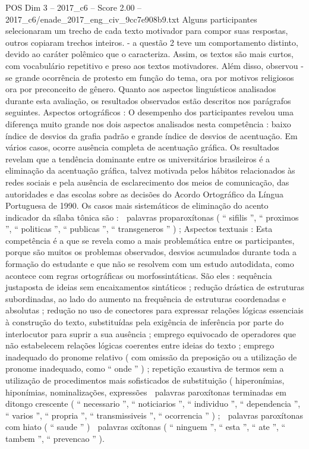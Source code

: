 \begin{textsample}{POS Dim 3 – 2017\_c6 – Score 2.00 – 2017\_c6/enade\_2017\_eng\_civ\_9cc7e908b9.txt}
Alguns participantes selecionaram um trecho de cada texto motivador para compor suas respostas, outros copiaram trechos inteiros. - a questão 2 teve um comportamento distinto, devido ao caráter polêmico que o caracteriza.
Assim, os textos são mais curtos, com vocabulário repetitivo e preso aos textos motivadores.
Além disso, observou -se grande ocorrência de protesto em função do tema, ora por motivos religiosos ora por preconceito de gênero.
Quanto aos aspectos linguísticos analisados durante esta avaliação, os resultados observados estão descritos nos parágrafos seguintes.
Aspectos ortográficos : O desempenho dos participantes revelou uma diferença muito grande nos dois aspectos analisados nesta competência : baixo índice de desvios da grafia padrão e grande índice de desvios de acentuação.
Em vários casos, ocorre ausência completa de acentuação gráfica.
Os resultados revelam que a tendência dominante entre os universitários brasileiros é a eliminação da acentuação gráfica, talvez motivada pelos hábitos relacionados às redes sociais e pela ausência de esclarecimento dos meios de comunicação, das autoridades e das escolas sobre as decisões do Acordo Ortográfico da Língua Portuguesa de 1990.
Os casos mais sistemáticos de eliminação do acento indicador da sílaba tônica são :  palavras proparoxítonas ( “ sifilis ”, “ proximos ”, “ politicas ”, “ publicas ”, “ transgeneros ” ) ; Aspectos textuais : Esta competência é a que se revela como a mais problemática entre os participantes, porque são muitos os problemas observados, desvios acumulados durante toda a formação do estudante e que não se resolvem com um estudo autodidata, como acontece com regras ortográficas ou morfossintáticas.
São eles : sequência justaposta de ideias sem encaixamentos sintáticos ; redução drástica de estruturas subordinadas, ao lado do aumento na frequência de estruturas coordenadas e absolutas ; redução no uso de conectores para expressar relações lógicas essenciais à construção do texto, substituídas pela exigência de inferência por parte do interlocutor para suprir a sua ausência ; emprego equivocado de operadores que não estabelecem relações lógicas coerentes entre ideias do texto ; emprego inadequado do pronome relativo ( com omissão da preposição ou a utilização de pronome inadequado, como “ onde ” ) ; repetição exaustiva de termos sem a utilização de procedimentos mais sofisticados de substituição ( hiperonímias, hiponímias, nominalizações, expressões  palavras paroxítonas terminadas em ditongo crescente ( “ necessario ”, “ noticiarios ”, “ individuo ”, “ dependencia ”, “ varios ”, “ propria ”, “ transmissiveis ”, “ ocorrencia ” ) ;  palavras paroxítonas com hiato ( “ saude ” )  palavras oxítonas ( “ ninguem ”, “ esta ”, “ ate ”, “ tambem ”, “ prevencao ” ).

\end{textsample}

